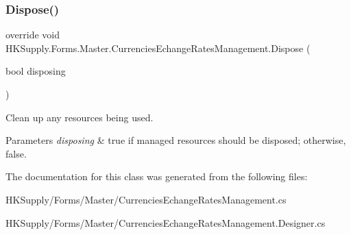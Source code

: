 \subsubsection{\texorpdfstring{Dispose()}{Dispose()}}
{\footnotesize\ttfamily override void H\+K\+Supply.\+Forms.\+Master.\+Currencies\+Echange\+Rates\+Management.\+Dispose (\begin{DoxyParamCaption}\item[{bool}]{disposing }\end{DoxyParamCaption})\hspace{0.3cm}{\ttfamily [protected]}}



Clean up any resources being used. 


\begin{DoxyParams}{Parameters}
{\em disposing} & true if managed resources should be disposed; otherwise, false.\\
\hline
\end{DoxyParams}


The documentation for this class was generated from the following files\+:\begin{DoxyCompactItemize}
\item 
H\+K\+Supply/\+Forms/\+Master/Currencies\+Echange\+Rates\+Management.\+cs\item 
H\+K\+Supply/\+Forms/\+Master/Currencies\+Echange\+Rates\+Management.\+Designer.\+cs\end{DoxyCompactItemize}
